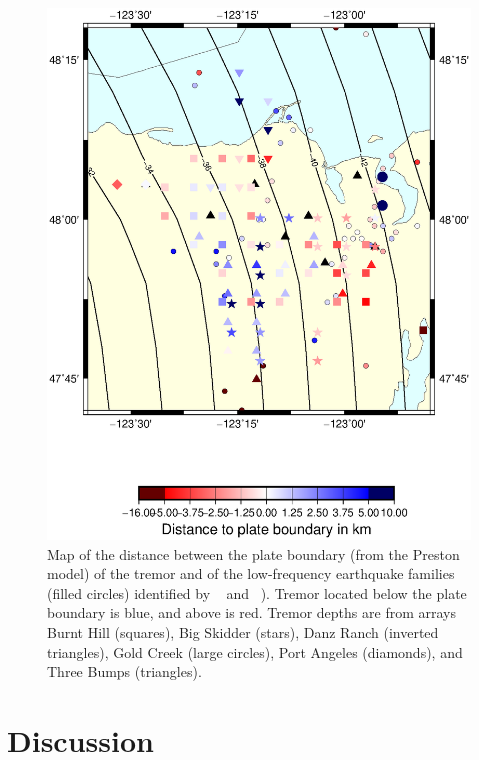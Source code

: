 \documentclass[draft]{agujournal2019}
\begin{document}
\begin{figure}
\noindent\includegraphics[width=\textwidth, trim={1cm 5cm 3.5cm 4cm},clip]{figures/d_to_pb_PWS_PWS_P.eps}
\caption{Map of the distance between the plate boundary (from the Preston model) of the tremor and of the low-frequency earthquake families (filled circles) identified by ~ and ~). Tremor located below the plate boundary is blue, and above is red. Tremor depths are from arrays Burnt Hill (squares), Big Skidder (stars), Danz Ranch (inverted triangles),  Gold Creek (large circles), Port Angeles (diamonds), and Three Bumps (triangles).}
\label{pngfiguresample}
\end{figure}

\section{Discussion}
\end{document}
